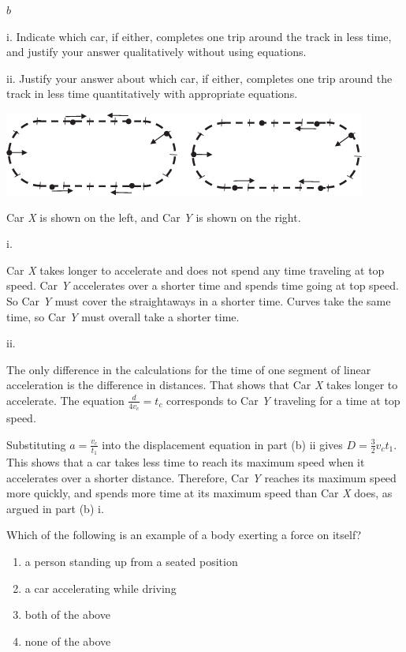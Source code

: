 \documentclass[
]{book}
\providecommand{\tightlist}{%
  \setlength{\itemsep}{0pt}\setlength{\parskip}{0pt}}
\begin{document}
\(b\)

i. Indicate which car, if either, completes one trip around the track
in less time, and justify your answer qualitatively without using
equations.

ii. Justify your answer about which car, if either, completes one trip
around the track in less time quantitatively with appropriate equations.

\leavevmode{}%
\includegraphics{images/Figure_04_01_05.jpg}

Car \emph{X} is shown on the left, and Car \emph{Y} is shown on the right.

i.

Car \emph{X} takes longer to accelerate and does not spend any time traveling
at top speed. Car \emph{Y} accelerates over a shorter time and spends time
going at top speed. So Car \emph{Y} must cover the straightaways in a shorter
time. Curves take the same time, so Car \emph{Y} must overall take a shorter
time.

ii.

The only difference in the calculations for the time of one segment of
linear acceleration is the difference in distances. That shows that Car
\emph{X} takes longer to accelerate. The equation \(\frac{d}{4v_{c}} = t_{c}\)
corresponds to Car \emph{Y} traveling for a time at top speed.

Substituting \(a = \frac{v_{c}}{t_{1}}\) into the displacement equation in
part (b) ii gives \(D = \frac{3}{2}v_{c}t_{1}\). This shows that a car
takes less time to reach its maximum speed when it accelerates over a
shorter distance. Therefore, Car \emph{Y} reaches its maximum speed more
quickly, and spends more time at its maximum speed than Car \emph{X} does, as
argued in part (b) i.

\hypertarget{fs-id1266227}{}
\leavevmode{}%
Which of the following is an example of a body exerting a force on
itself?

\begin{enumerate}
\def\labelenumi{\alph{enumi}.}
\tightlist
\item
  a person standing up from a seated position
\item
  a car accelerating while driving
\item
  both of the above
\item
  none of the above
\end{enumerate}
\end{document}

